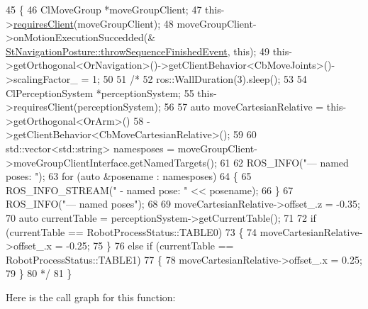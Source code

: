 \begin{DoxyCode}
45     \{
46         ClMoveGroup *moveGroupClient;
47         this->\hyperlink{classsmacc_1_1ISmaccState_a7f95c9f0a6ea2d6f18d1aec0519de4ac}{requiresClient}(moveGroupClient);
48         moveGroupClient->onMotionExecutionSuccedded(&
      \hyperlink{classsmacc_1_1SmaccState_a49dcfc25824f7e083dd4b999c49ab2b6}{StNavigationPosture::throwSequenceFinishedEvent}, \textcolor{keyword}{this});
49         this->getOrthogonal<OrNavigation>()->getClientBehavior<CbMoveJoints>()->scalingFactor\_ = 1;
50 
51         \textcolor{comment}{/*}
52 \textcolor{comment}{        ros::WallDuration(3).sleep();}
53 \textcolor{comment}{}
54 \textcolor{comment}{        ClPerceptionSystem *perceptionSystem;}
55 \textcolor{comment}{        this->requiresClient(perceptionSystem);}
56 \textcolor{comment}{}
57 \textcolor{comment}{        auto moveCartesianRelative = this->getOrthogonal<OrArm>()}
58 \textcolor{comment}{                                         ->getClientBehavior<CbMoveCartesianRelative>();}
59 \textcolor{comment}{}
60 \textcolor{comment}{        std::vector<std::string> namesposes = moveGroupClient->moveGroupClientInterface.getNamedTargets();}
61 \textcolor{comment}{}
62 \textcolor{comment}{        ROS\_INFO("--- named poses: ");}
63 \textcolor{comment}{        for (auto &posename : namesposes)}
64 \textcolor{comment}{        \{}
65 \textcolor{comment}{            ROS\_INFO\_STREAM(" - named pose: " << posename);}
66 \textcolor{comment}{        \}}
67 \textcolor{comment}{        ROS\_INFO("--- named poses");}
68 \textcolor{comment}{}
69 \textcolor{comment}{        moveCartesianRelative->offset\_.z = -0.35;}
70 \textcolor{comment}{        auto currentTable = perceptionSystem->getCurrentTable();}
71 \textcolor{comment}{}
72 \textcolor{comment}{        if (currentTable == RobotProcessStatus::TABLE0)}
73 \textcolor{comment}{        \{}
74 \textcolor{comment}{            moveCartesianRelative->offset\_.x = -0.25;}
75 \textcolor{comment}{        \}}
76 \textcolor{comment}{        else if (currentTable == RobotProcessStatus::TABLE1)}
77 \textcolor{comment}{        \{}
78 \textcolor{comment}{            moveCartesianRelative->offset\_.x = 0.25;}
79 \textcolor{comment}{        \}}
80 \textcolor{comment}{    */}
81     \}
\end{DoxyCode}
Here is the call graph for this function\+:
\nopagebreak
